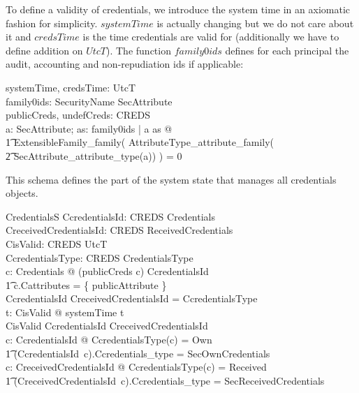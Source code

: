 To define a validity of credentials, we introduce the system time in an
axiomatic fashion for simplicity.  $systemTime$ is actually changing but we do
not care about it and $credsTime$ is the time credentials are valid for
(additionally we have to define addition on $UtcT$).  The function $family0ids$
defines for each principal the audit, accounting and non-repudiation ids if
applicable:
\begin{axdef}
  systemTime, credsTime: UtcT \\
  family0ids: SecurityName \fun \power SecAttribute \\
  publicCreds, undefCreds: CREDS \\
  \where
  \forall a: SecAttribute; as: \ran family0ids | a \in as @ \\
  \t1 ExtensibleFamily\_family( AttributeType\_attribute\_family( \\
  \t2 SecAttribute\_attribute\_type(a)) ) = 0 \\ 
\end{axdef}
This schema defines the part of the system state that manages all credentials
objects.
\begin{schema}{CredentialsS}
  CcredentialsId: CREDS \pfun Credentials \\
  CreceivedCredentialsId: CREDS \pfun ReceivedCredentials \\
  CisValid: CREDS \rel UtcT \\
  CcredentialsType: CREDS \fun CredentialsType \\
  \where
  \exists c: Credentials @ (publicCreds \mapsto c) \in CcredentialsId \land \\
  \t1 c.Cattributes = \{ publicAttribute \} \\
  \dom CcredentialsId \cup \dom CreceivedCredentialsId = \dom CcredentialsType \\
  \forall t: \ran CisValid @ systemTime \utctl t \\
  \dom CisValid \subseteq \dom CcredentialsId \cup \dom CreceivedCredentialsId
  \\
  \forall c: \dom CcredentialsId @  CcredentialsType(c) = Own \land \\
  \t1 (CcredentialsId~c).Ccredentials\_type = SecOwnCredentials \\
  \forall c: \dom CreceivedCredentialsId @  CcredentialsType(c) = Received \land
  \\
  \t1 (CreceivedCredentialsId~c).Ccredentials\_type = SecReceivedCredentials \\
\end{schema}


